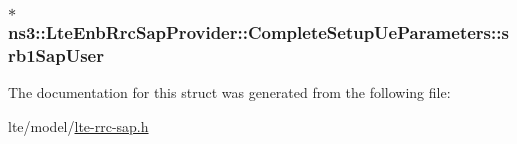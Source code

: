 \subsubsection[{\texorpdfstring{srb1\+Sap\+User}{srb1SapUser}}]{$\ast$ ns3\+::\+Lte\+Enb\+Rrc\+Sap\+Provider\+::\+Complete\+Setup\+Ue\+Parameters\+::srb1\+Sap\+User}\hypertarget{structns3_1_1LteEnbRrcSapProvider_1_1CompleteSetupUeParameters_a7025f17034b8298ee744a16ab4bdd4a7}{}\label{structns3_1_1LteEnbRrcSapProvider_1_1CompleteSetupUeParameters_a7025f17034b8298ee744a16ab4bdd4a7}


The documentation for this struct was generated from the following file\+:\begin{DoxyCompactItemize}
\item 
lte/model/\hyperlink{lte-rrc-sap_8h}{lte-\/rrc-\/sap.\+h}\end{DoxyCompactItemize}

